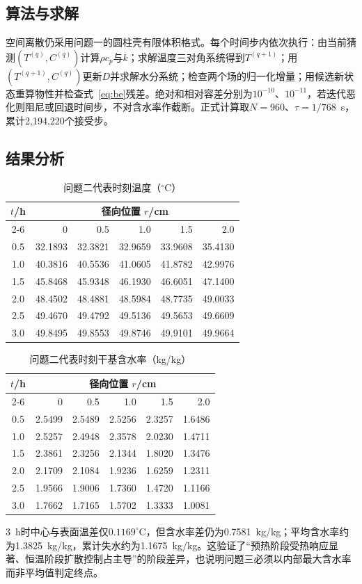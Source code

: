 \documentclass[UTF8,a4paper,zihao=-4,fontset=fandol]{ctexart}
\begin{document}
\subsection{算法与求解}
空间离散仍采用问题一的圆柱壳有限体积格式。每个时间步内依次执行：由当前猜测$(T^{(q)},C^{(q)})$计算$\rho c_p$与$k$；求解温度三对角系统得到$T^{(q+1)}$；用$(T^{(q+1)},C^{(q)})$更新$D$并求解水分系统；检查两个场的归一化增量；用候选新状态重算物性并检查式~\eqref{eq:be}残差。绝对和相对容差分别为$10^{-10}$、$10^{-11}$，若迭代恶化则阻尼或回退时间步，不对含水率作截断。正式计算取$N=960$、$\tau=1/768$~s，累计2,194,220个接受步。
\subsection{结果分析}
\begin{table}[htbp]
\centering\small
\caption{问题二代表时刻温度（$^\circ$C）}\label{tab:q2t}
\begin{tabular}{crrrrr}
\toprule
$t$/h&\multicolumn{5}{c}{径向位置 $r$/cm}\\\cmidrule(lr){2-6}
&0&0.5&1.0&1.5&2.0\\\midrule
0.5&32.1893&32.3821&32.9659&33.9608&35.4130\\
1.0&40.3816&40.5536&41.0605&41.8782&42.9976\\
1.5&45.8468&45.9348&46.1930&46.6051&47.1400\\
2.0&48.4502&48.4881&48.5984&48.7735&49.0033\\
2.5&49.4670&49.4792&49.5136&49.5653&49.6609\\
3.0&49.8495&49.8553&49.8746&49.9101&49.9664\\\bottomrule
\end{tabular}
\end{table}
\begin{table}[htbp]
\centering\small
\caption{问题二代表时刻干基含水率（kg/kg）}\label{tab:q2c}
\begin{tabular}{crrrrr}
\toprule
$t$/h&\multicolumn{5}{c}{径向位置 $r$/cm}\\\cmidrule(lr){2-6}
&0&0.5&1.0&1.5&2.0\\\midrule
0.5&2.5499&2.5489&2.5256&2.3257&1.6486\\
1.0&2.5257&2.4948&2.3578&2.0230&1.4711\\
1.5&2.3861&2.3256&2.1344&1.8020&1.3476\\
2.0&2.1709&2.1084&1.9236&1.6259&1.2311\\
2.5&1.9566&1.9006&1.7360&1.4720&1.1166\\
3.0&1.7662&1.7165&1.5702&1.3333&1.0081\\\bottomrule
\end{tabular}
\end{table}
3~h时中心与表面温差仅$0.1169^\circ\mathrm C$，但含水率差仍为0.7581~kg/kg；平均含水率约为1.3825~kg/kg，累计失水约为1.1675~kg/kg。这验证了“预热阶段受热响应显著、恒温阶段扩散控制占主导”的阶段差异，也说明问题三必须以内部最大含水率而非平均值判定终点。
\end{document}
